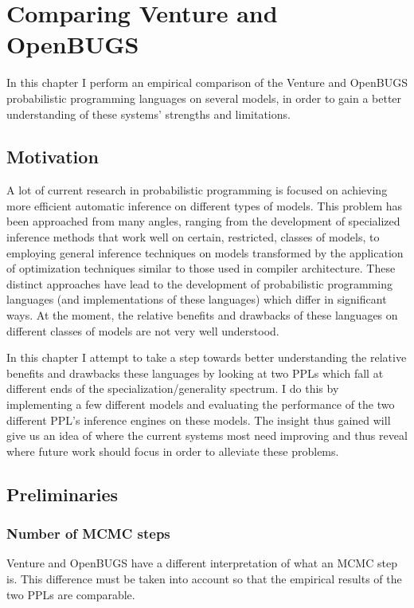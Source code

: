 \chapter{Comparing Venture and OpenBUGS}

In this chapter I perform an empirical comparison of the Venture and OpenBUGS probabilistic programming languages on several models, in order to gain a better understanding of these systems' strengths and limitations.

\section{Motivation}

A lot of current research in probabilistic programming is focused on achieving more efficient automatic inference on different types of models. This problem has been approached from many angles, ranging from the development of specialized inference methods that work well on certain, restricted, classes of models, to employing general inference techniques on models transformed by the application of optimization techniques similar to those used in compiler architecture. These distinct approaches have lead to the development of probabilistic programming languages (and implementations of these languages) which differ in significant ways.  At the moment, the relative benefits and drawbacks of these languages on different classes of models are not very well understood. 

In this chapter I attempt to take a step towards better understanding the relative benefits and drawbacks these languages by looking at two PPLs which fall at different ends of the specialization/generality spectrum. I do this by implementing a few different models and evaluating the performance of the two different PPL's inference engines on these models. The insight thus gained will give us an idea of where the current systems most need improving and thus reveal where future work should focus in order to alleviate these problems.

\section{Preliminaries}

\subsection{Number of MCMC steps}
Venture and OpenBUGS have a different interpretation of what an MCMC step is. This difference must be taken into account so that the empirical results of the two PPLs are comparable.

